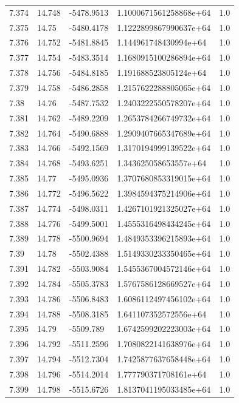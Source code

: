 \begin{tabular}{lllll}
7.374 & 14.748 & -5478.9513 & 1.1000671561258868e+64 & 1.0 \\
7.375 & 14.75 & -5480.4178 & 1.1222899867990637e+64 & 1.0 \\
7.376 & 14.752 & -5481.8845 & 1.144961748430994e+64 & 1.0 \\
7.377 & 14.754 & -5483.3514 & 1.1680915100286894e+64 & 1.0 \\
7.378 & 14.756 & -5484.8185 & 1.191688523805124e+64 & 1.0 \\
7.379 & 14.758 & -5486.2858 & 1.2157622288805065e+64 & 1.0 \\
7.38 & 14.76 & -5487.7532 & 1.2403222550578207e+64 & 1.0 \\
7.381 & 14.762 & -5489.2209 & 1.2653784266749732e+64 & 1.0 \\
7.382 & 14.764 & -5490.6888 & 1.2909407665347689e+64 & 1.0 \\
7.383 & 14.766 & -5492.1569 & 1.3170194999139522e+64 & 1.0 \\
7.384 & 14.768 & -5493.6251 & 1.343625058653557e+64 & 1.0 \\
7.385 & 14.77 & -5495.0936 & 1.3707680853319015e+64 & 1.0 \\
7.386 & 14.772 & -5496.5622 & 1.3984594375214906e+64 & 1.0 \\
7.387 & 14.774 & -5498.0311 & 1.4267101921325027e+64 & 1.0 \\
7.388 & 14.776 & -5499.5001 & 1.4555316498434245e+64 & 1.0 \\
7.389 & 14.778 & -5500.9694 & 1.4849353396215893e+64 & 1.0 \\
7.39 & 14.78 & -5502.4388 & 1.5149330233350465e+64 & 1.0 \\
7.391 & 14.782 & -5503.9084 & 1.5455367004572146e+64 & 1.0 \\
7.392 & 14.784 & -5505.3783 & 1.5767586128669527e+64 & 1.0 \\
7.393 & 14.786 & -5506.8483 & 1.6086112497456102e+64 & 1.0 \\
7.394 & 14.788 & -5508.3185 & 1.641107352572556e+64 & 1.0 \\
7.395 & 14.79 & -5509.789 & 1.6742599202223003e+64 & 1.0 \\
7.396 & 14.792 & -5511.2596 & 1.7080822141638976e+64 & 1.0 \\
7.397 & 14.794 & -5512.7304 & 1.7425877637658448e+64 & 1.0 \\
7.398 & 14.796 & -5514.2014 & 1.777790371708161e+64 & 1.0 \\
7.399 & 14.798 & -5515.6726 & 1.8137041195033485e+64 & 1.0 \\

\end{tabular}

